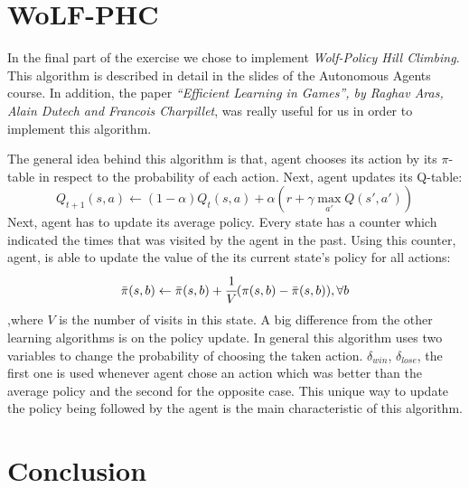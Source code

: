 \documentclass[a4paper,11pt]{article}
\begin{document}
\section{WoLF-PHC}
In the final part of the exercise we chose to implement \textit{Wolf-Policy Hill Climbing}. This algorithm is described in detail in the slides of the Autonomous Agents course. In addition, the paper \textit{``Efficient Learning in Games'', by Raghav Aras, Alain Dutech and Francois Charpillet}, was really useful for us in order to implement this algorithm.

The general idea behind this algorithm is that, agent chooses its action by its $\pi$-table in respect to the probability of each action. Next, agent updates its Q-table:
\[
Q_{t+1}(s,a) \leftarrow (1-\alpha)Q_{t}(s,a)+\alpha(r + \gamma \max_{a'}Q(s',a'))
\]
Next, agent has to update its average policy. Every state has a counter which indicated the times that was visited by the agent in the past. Using this counter, agent, is able to update the value of the its current state's policy for all actions:
\[
\bar{\pi}(s,b) \leftarrow \bar{\pi}(s,b) + \cfrac{1}{V} (\pi(s,b) - \bar{\pi}(s,b)), \forall b
\]
,where $V$ is the number of visits in this state. A big difference from the other learning algorithms is on the policy update. In general this algorithm uses two variables to change the probability of choosing the taken action. $\delta_{win}$, $\delta_{lose}$, the first one is used whenever agent chose an action which was better than the average policy and the second for the opposite case. This unique way to update the policy being followed by the agent is the main characteristic of this algorithm.
\section{Conclusion}
\end{document}
